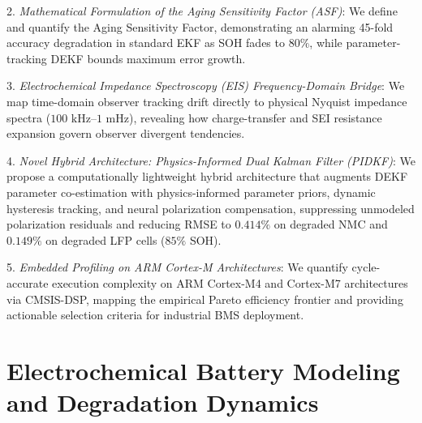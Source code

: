 \documentclass[balance,nocopyright,upint,varvw,hyphenate,barcolor=NavyBlue,nolists]{asmejour}
\begin{document}
2. \emph{Mathematical Formulation of the Aging Sensitivity Factor (ASF)}: We define and quantify the Aging Sensitivity Factor, demonstrating an alarming 45-fold accuracy degradation in standard EKF as SOH fades to $80\%$, while parameter-tracking DEKF bounds maximum error growth.

3. \emph{Electrochemical Impedance Spectroscopy (EIS) Frequency-Domain Bridge}: We map time-domain observer tracking drift directly to physical Nyquist impedance spectra ($100\text{ kHz}\text{--}1\text{ mHz}$), revealing how charge-transfer and SEI resistance expansion govern observer divergent tendencies.

4. \emph{Novel Hybrid Architecture: Physics-Informed Dual Kalman Filter (PIDKF)}: We propose a computationally lightweight hybrid architecture that augments DEKF parameter co-estimation with physics-informed parameter priors, dynamic hysteresis tracking, and neural polarization compensation, suppressing unmodeled polarization residuals and reducing RMSE to $0.414\%$ on degraded NMC and $0.149\%$ on degraded LFP cells ($85\%$ SOH).

5. \emph{Embedded Profiling on ARM Cortex-M Architectures}: We quantify cycle-accurate execution complexity on ARM Cortex-M4 and Cortex-M7 architectures via CMSIS-DSP, mapping the empirical Pareto efficiency frontier and providing actionable selection criteria for industrial BMS deployment.

\section{Electrochemical Battery Modeling and Degradation Dynamics}
\end{document}
